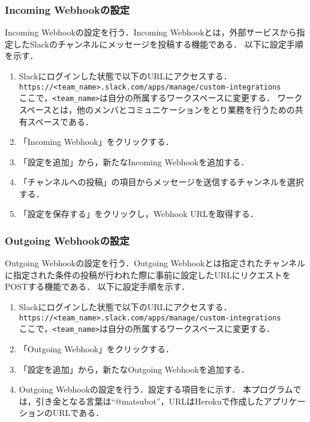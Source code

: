 \documentclass[12pt]{jsarticle}
\begin{document}
\subsubsection{Incoming Webhookの設定}\label{subsubsec:setting Incoming Webhook}
Incoming Webhookの設定を行う．Incoming Webhookとは，外部サービスから指定したSlackのチャンネルにメッセージを投稿する機能である．
以下に設定手順を示す．
\begin{enumerate}\label{enum:setting Incoming Webhook}
\item Slackにログインした状態で以下のURLにアクセスする．\\
\verb|https://<team_name>.slack.com/apps/manage/custom-integrations|\\
ここで，\verb|<team_name>|は自分の所属するワークスペースに変更する．
ワークスペースとは，他のメンバとコミュニケーションをとり業務を行うための共有スペースである．
\item 「Incoming Webhook」をクリックする．
\item 「設定を追加」から，新たなIncoming Webhookを追加する．
\item 「チャンネルへの投稿」の項目からメッセージを送信するチャンネルを選択する．
\item 「設定を保存する」をクリックし，Webhook URLを取得する．\label{enum:get Webhook URL}
\end{enumerate}

\subsubsection{Outgoing Webhookの設定}\label{subsubsec:setting Outgoing Webhook}
Outgoing Webhookの設定を行う．Outgoing Webhookとは指定されたチャンネルに指定された条件の投稿が行われた際に事前に設定したURLにリクエストをPOSTする機能である．
以下に設定手順を示す．
\begin{enumerate}
\item Slackにログインした状態で以下のURLにアクセスする．\\
\verb|https://<team_name>.slack.com/apps/manage/custom-integrations|\\
ここで，\verb|<team_name>|は自分の所属するワークスペースに変更する．
\item 「Outgoing Webhook」をクリックする．
\item 「設定を追加」から，新たなOutgoing Webhookを追加する．
\item Outgoing Webhookの設定を行う．設定する項目をに示す．
本プログラムでは，引き金となる言葉は``@matsubot''，URLはHerokuで作成したアプリケーションのURLである．
\end{enumerate}
\end{document}
